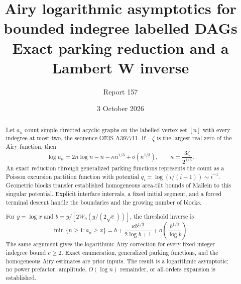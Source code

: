 \documentclass[11pt,letterpaper]{article}
\title{Airy logarithmic asymptotics for bounded indegree labelled DAGs\\\large Exact parking reduction and a Lambert W inverse}
\author{Report 157}
\date{3 October 2026}
\numberwithin{equation}{section}
\theoremstyle{remark}\newtheorem{remark}[theorem]{Remark}
\begin{document}
\maketitle
\begin{abstract}
Let $a_n$ count simple directed acyclic graphs on the labelled vertex set
$[n]$ with every indegree at most two, the sequence OEIS A397711. If
$-\zeta$ is the largest real zero of the Airy function, then
\[
 \log a_n=2n\log n-n-\kappa n^{1/3}+o(n^{1/3}),
 \qquad \kappa=\frac{3\zeta}{2^{1/3}}.
\]
An exact reduction through generalized parking functions represents the
count as a Poisson excursion partition function with potential
$q_i=\log(i/(i-1))\sim i^{-1}$. Geometric blocks transfer established
homogeneous area-tilt bounds of Mallein to this singular potential.
Explicit interface intervals, a fixed initial segment, and a forced
terminal descent handle the boundaries and the growing number of blocks.

For $y=\log x$ and $b=y/[2W_0(y/(2\sqrt e))]$, the threshold inverse is
\[
 \min\{n\geq1:a_n\geq x\}
 =b+\frac{\kappa b^{1/3}}{2\log b+1}
   +o\!\left(\frac{b^{1/3}}{\log b}\right).
\]
The same argument gives the logarithmic Airy correction for every fixed
integer indegree bound $c\geq2$. Exact enumeration, generalized parking
functions, and the homogeneous Airy estimates are prior inputs. The
result is a logarithmic asymptotic; no power prefactor, amplitude,
$O(\log n)$ remainder, or all-orders expansion is established.
\end{abstract}
\end{document}

